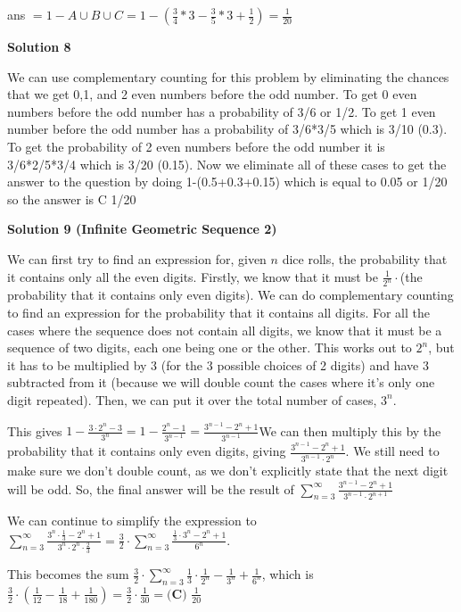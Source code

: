 \begin{enumerate}
 ans $= 1 - A\cup B\cup C = 1- (\frac{3}{4} * 3 - \frac{3}{5} * 3 + \frac{1}{2}) = \frac{1}{20}$




\textbf{Solution 8}

We can use complementary counting for this problem by eliminating the chances that we get 0,1, and 2 even numbers before the odd number. To get 0 even numbers before the odd number has a probability of 3/6 or 1/2. To get 1 even number before the odd number has a probability of 3/6*3/5 which is 3/10 (0.3). To get the probability of 2 even numbers before the odd number it is 3/6*2/5*3/4 which is 3/20 (0.15). Now we eliminate all of these cases to get the answer to the question by doing 1-(0.5+0.3+0.15) which is equal to 0.05 or 1/20 so the answer is C 1/20

 



\textbf{Solution 9 (Infinite Geometric Sequence 2)}

We can first try to find an expression for, given $n$ dice rolls, the probability that it contains only all the even digits. Firstly, we know that it must be $\frac{1}{2^{n}}\cdot$(the probability that it contains only even digits). We can do complementary counting to find an expression for the probability that it contains all digits. For all the cases where the sequence does not contain all digits, we know that it must be a sequence of two digits, each one being one or the other. This works out to $2^{n}$, but it has to be multiplied by 3 (for the 3 possible choices of 2 digits) and have 3 subtracted from it (because we will double count the cases where it's only one digit repeated). Then, we can put it over the total number of cases, $3^{n}$. 

 This gives $1 - \frac{3\cdot2^{n}-3}{3^{n}} = 1 - \frac{2^{n}-1}{3^{n-1}} = \frac{3^{n-1}-2^{n}+1}{3^{n-1}}$We can then multiply this by the probability that it contains only even digits, giving $\frac{3^{n-1}-2^{n}+1}{3^{n-1}\cdot2^{n}}$. We still need to make sure we don't double count, as we don't explicitly state that the next digit will be odd. So, the final answer will be the result of $\sum_{n=3}^{\infty}\frac{3^{n-1}-2^{n}+1}{3^{n-1}\cdot2^{n+1}}$

 We can continue to simplify the expression to $\sum_{n=3}^{\infty} \frac{3^n\cdot\frac{1}{3}-2^n+1}{3^n\cdot 2^n\cdot \frac{2}{3}} = \frac{3}{2} \cdot\sum_{n=3}^{\infty} \frac{\frac{1}{3}\cdot 3^n-2^n+1}{6^n}$. 

 This becomes the sum $\frac{3}{2} \cdot \sum_{n=3}^{\infty} \frac{1}{3} \cdot \frac{1}{2^n} - \frac{1}{3^n} + \frac{1}{6^n}$, which is $\frac{3}{2} \cdot (\frac{1}{12} - \frac{1}{18} + \frac{1}{180}) = \frac{3}{2}\cdot\frac{1}{30} = \boxed{\textbf{(C) }\frac{1}{20}}$





\end{enumerate}
